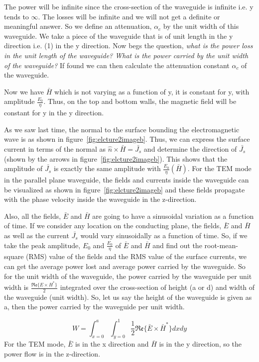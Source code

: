 The power will be infinite since the cross-section of the waveguide is infinite i.e. y tends to $\infty$. The losses will be infinite and we will not get a definite or meaningful answer. So we define an attenuation, $\alpha_{c}$ by the unit width of this waveguide. We take a piece of the waveguide that is of unit length in the y direction i.e. (1) in the y direction. Now begs the question, \emph{what is the power loss in the unit length of the waveguide? What is the power carried by the unit width of the waveguide?} If found we can then calculate the attenuation constant $\alpha_{c}$ of the waveguide.

Now we have $\bar{H}$ which is not varying as a function of y, it is constant for y, with amplitude $\frac{E_0}{\eta}$. Thus, on the top and bottom walls, the magnetic field will be constant for y in the y direction.

As we saw last time, the normal to the surface bounding the electromagnetic wave is as shown in figure~\ref{fig:elcture2imageb}. Thus, we can express the surface current in terms of the normal as $\hat{n}\times\bar{H}=\bar{J_s}$ and determine the direction of $\bar{J_s}$ (shown by the arrows in figure~\ref{fig:elcture2imageb}). This shows that the amplitude of $\bar{J_s}$ is exactly the same amplitude with $\frac{E_0}{\eta}(\bar{H})$. For the TEM mode in the parallel plane waveguide, the fields and currents inside the waveguide can be visualized as shown in figure~\ref{fig:elcture2imageb} and these fields propagate with the phase velocity inside the waveguide in the z-direction.

Also, all the fields, $\bar{E}$ and $\bar{H}$ are going to have a sinusoidal variation as a function of time. If we consider any location on the conducting plane, the fields, $\bar{E}$ and $\bar{H}$ as well as the current $\bar{J_s}$ would vary sinusoidally as a function of time. So, if we take the peak amplitude, $E_0$ and $\frac{E_0}{\eta}$ of $\bar{E}$ and $\bar{H}$ and find out the root-mean-square (RMS) value of the fields and the RMS value of the surface currents, we can get the average power lost and average power carried by the waveguide. So for the unit width of the waveguide, the power carried by the waveguide per unit width is $\frac{\mathfrak{Re}\lbrace E \times H^*\rbrace}{2}$ integrated over the cross-section of height (a or d) and width of the waveguide (unit width). So, let us say the height of the waveguide is given as a, then the power carried by the waveguide per unit width.

\begin{equation}
W=\int_{x=0}^{a}\int_{y=0}^{1} \frac{1}{2}\mathfrak{Re}\lbrace\bar{E} \times \bar{H}^\ast\rbrace dxdy
\label{eqn:powerparawaveguide}	
\end{equation}
For the TEM mode, $\bar{E}$ is in the x direction and $\bar{H}$ is in the y direction, so the power flow is in the z-direction.

